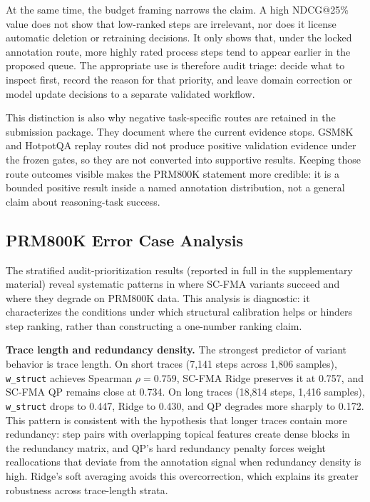 \documentclass[a4paper,fleqn]{cas-sc}
\begin{document}
At the same time, the budget framing narrows the claim. A high NDCG@25\% value does not show that low-ranked steps are irrelevant, nor does it license automatic deletion or retraining decisions. It only shows that, under the locked annotation route, more highly rated process steps tend to appear earlier in the proposed queue. The appropriate use is therefore audit triage: decide what to inspect first, record the reason for that priority, and leave domain correction or model update decisions to a separate validated workflow.

This distinction is also why negative task-specific routes are retained in the submission package. They document where the current evidence stops. GSM8K and HotpotQA replay routes did not produce positive validation evidence under the frozen gates, so they are not converted into supportive results. Keeping those route outcomes visible makes the PRM800K statement more credible: it is a bounded positive result inside a named annotation distribution, not a general claim about reasoning-task success.

\subsection{PRM800K Error Case Analysis}
\label{sec:prm800k-error}

The stratified audit-prioritization results (reported in full in the supplementary material) reveal systematic patterns in where SC-FMA variants succeed and where they degrade on PRM800K data. This analysis is diagnostic: it characterizes the conditions under which structural calibration helps or hinders step ranking, rather than constructing a one-number ranking claim.

\medskip
\noindent\textbf{Trace length and redundancy density.} The strongest predictor of variant behavior is trace length. On short traces (7,141 steps across 1,806 samples), \texttt{w\_struct} achieves Spearman $\rho=0.759$, SC-FMA Ridge preserves it at 0.757, and SC-FMA QP remains close at 0.734. On long traces (18,814 steps, 1,416 samples), \texttt{w\_struct} drops to 0.447, Ridge to 0.430, and QP degrades more sharply to 0.172. This pattern is consistent with the hypothesis that longer traces contain more redundancy: step pairs with overlapping topical features create dense blocks in the redundancy matrix, and QP's hard redundancy penalty forces weight reallocations that deviate from the annotation signal when redundancy density is high. Ridge's soft averaging avoids this overcorrection, which explains its greater robustness across trace-length strata.
\end{document}
